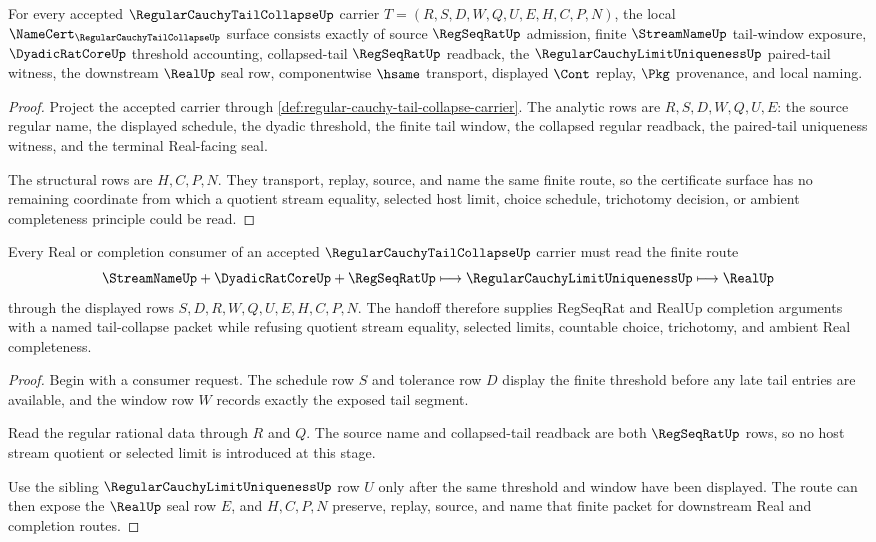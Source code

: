 \begin{theorem}
\label{thm:regular-cauchy-tail-collapse-namecert-obligations}
For every accepted $\RegularCauchyTailCollapseUp$ carrier $T=(R,S,D,W,Q,U,E,H,C,P,N)$, the local $\NameCert_{\RegularCauchyTailCollapseUp}$ surface consists exactly of source $\RegSeqRatUp$ admission, finite $\StreamNameUp$ tail-window exposure, $\DyadicRatCoreUp$ threshold accounting, collapsed-tail $\RegSeqRatUp$ readback, the $\RegularCauchyLimitUniquenessUp$ paired-tail witness, the downstream $\RealUp$ seal row, componentwise $\hsame$ transport, displayed $\Cont$ replay, $\Pkg$ provenance, and local naming.
\end{theorem}
\begin{proof}
Project the accepted carrier through \autoref{def:regular-cauchy-tail-collapse-carrier}. The analytic rows are $R,S,D,W,Q,U,E$: the source regular name, the displayed schedule, the dyadic threshold, the finite tail window, the collapsed regular readback, the paired-tail uniqueness witness, and the terminal Real-facing seal.

The structural rows are $H,C,P,N$. They transport, replay, source, and name the same finite route, so the certificate surface has no remaining coordinate from which a quotient stream equality, selected host limit, choice schedule, trichotomy decision, or ambient completeness principle could be read.
\end{proof}

\begin{theorem}
\label{thm:regular-cauchy-tail-collapse-handoff}
Every Real or completion consumer of an accepted $\RegularCauchyTailCollapseUp$ carrier must read the finite route
$$
\StreamNameUp+\DyadicRatCoreUp+\RegSeqRatUp \longmapsto \RegularCauchyLimitUniquenessUp \longmapsto \RealUp
$$
through the displayed rows $S,D,R,W,Q,U,E,H,C,P,N$. The handoff therefore supplies RegSeqRat and RealUp completion arguments with a named tail-collapse packet while refusing quotient stream equality, selected limits, countable choice, trichotomy, and ambient Real completeness.
\end{theorem}
\begin{proof}
Begin with a consumer request. The schedule row $S$ and tolerance row $D$ display the finite threshold before any late tail entries are available, and the window row $W$ records exactly the exposed tail segment.

Read the regular rational data through $R$ and $Q$. The source name and collapsed-tail readback are both $\RegSeqRatUp$ rows, so no host stream quotient or selected limit is introduced at this stage.

Use the sibling $\RegularCauchyLimitUniquenessUp$ row $U$ only after the same threshold and window have been displayed. The route can then expose the $\RealUp$ seal row $E$, and $H,C,P,N$ preserve, replay, source, and name that finite packet for downstream Real and completion routes.
\end{proof}

